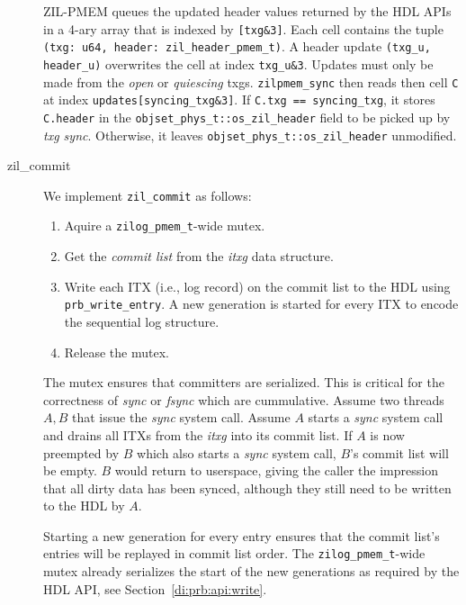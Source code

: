 \documentclass[12pt,a4paper,twoside]{book}
\begin{document}
\begin{description}
        ZIL-PMEM queues the updated header values returned by the HDL APIs in a 4-ary array that is indexed by \lstinline{[txg&3]}.
        Each cell contains the tuple \lstinline{(txg: u64, header: zil_header_pmem_t)}.
        A header update \lstinline{(txg_u, header_u)} overwrites the cell at index \lstinline{txg_u&3}.
        Updates must only be made from the \textit{open} or \textit{quiescing} txgs.
        \lstinline{zilpmem_sync} then reads then cell \lstinline{C} at index \lstinline{updates[syncing_txg&3]}.
        If \lstinline{C.txg == syncing_txg}, it stores \lstinline{C.header} in the \lstinline{objset_phys_t::os_zil_header} field to be picked up by \textit{txg sync}.
        Otherwise, it leaves \lstinline{objset_phys_t::os_zil_header} unmodified.

    \item[zil\_commit]
        We implement \lstinline{zil_commit} as follows:
        \begin{enumerate}[noitemsep]
            \item Aquire a \lstinline{zilog_pmem_t}-wide mutex.
            \item Get the \textit{commit list} from the \textit{itxg} data structure.
            \item Write each ITX (i.e., log record) on the commit list to the HDL using \lstinline{prb_write_entry}.
                A new generation is started for every ITX to encode the sequential log structure.
            \item Release the mutex.
        \end{enumerate}
        The mutex ensures that committers are serialized.
        This is critical for the correctness of \textit{sync} or \textit{fsync} which are cummulative.
        Assume two threads $A, B$ that issue the \textit{sync} system call.
        Assume $A$ starts a \textit{sync} system call and drains all ITXs from the \textit{itxg} into its commit list.
        If $A$ is now preempted by $B$ which also starts a \textit{sync} system call, $B$'s commit list will be empty.
        $B$ would return to userspace, giving the caller the impression that all dirty data has been synced, although they still need to be written to the HDL by $A$.

        Starting a new generation for every entry ensures that the commit list's entries will be replayed in commit list order.
        The \lstinline{zilog_pmem_t}-wide mutex already serializes the start of the new generations as required by the HDL API, see Section~\ref{di:prb:api:write}.


\end{description}
\end{document}
